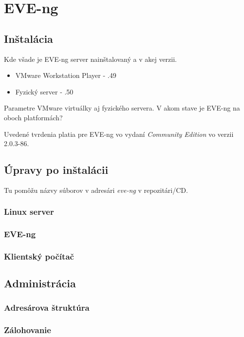 \chapter{EVE-ng}

\section{Inštalácia}

Kde všade je EVE-ng server nainštalovaný a v akej verzii.

\begin{itemize}
    \item VMware Workstation Player - .49
    \item Fyzický server - .50
\end{itemize}

Parametre VMware virtuálky aj fyzického servera. V akom stave je EVE-ng na oboch platformách?

Uvedené tvrdenia platia pre EVE-ng vo vydaní \emph{Community Edition} vo verzii 2.0.3-86.

\section{Úpravy po inštalácii}

Tu pomôžu názvy súborov v adresári \emph{eve-ng} v repozitári/CD.

\subsection{Linux server}

\subsection{EVE-ng}

\subsection{Klientský počítač}

\section{Administrácia}

\subsection{Adresárova štruktúra}

\subsection{Zálohovanie}

